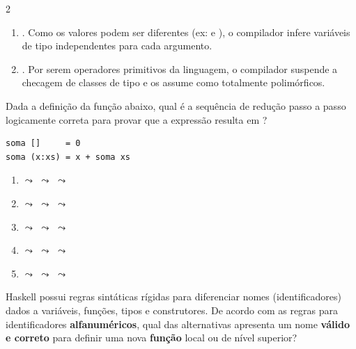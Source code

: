 \documentclass[a4paper,10pt,brazil]{article}
\begin{document}
\begin{multicols}{2}
\begin{enumerate}
  \item {}. Como os valores podem ser diferentes (ex:  e ), o compilador infere variáveis de tipo independentes para cada argumento.

  \item {}. Por serem operadores primitivos da linguagem, o compilador suspende a checagem de classes de tipo e os assume como totalmente polimórficos.


\end{enumerate}

Dada a definição da função  abaixo, qual é a sequência de redução passo a passo logicamente correta para provar que a expressão  resulta em ?

\begin{verbatim}
soma []     = 0
soma (x:xs) = x + soma xs
\end{verbatim}

\begin{enumerate}
  \item {} $\leadsto$  $\leadsto$  $\leadsto$ 

  \item {} $\leadsto$  $\leadsto$  $\leadsto$ 

  \item {} $\leadsto$  $\leadsto$  $\leadsto$ 

  \item {} $\leadsto$  $\leadsto$  $\leadsto$ 

  \item {} $\leadsto$  $\leadsto$  $\leadsto$ 


\end{enumerate}

Haskell possui regras sintáticas rígidas para diferenciar nomes (identificadores) dados a variáveis, funções, tipos e construtores. De acordo com as regras para identificadores \textbf{alfanuméricos}, qual das alternativas apresenta um nome \textbf{válido e correto} para definir uma nova \textbf{função} local ou de nível superior?


\end{multicols}
\end{document}
